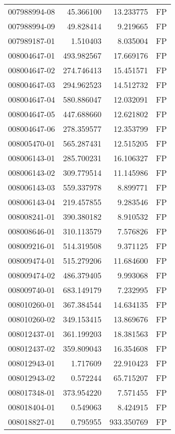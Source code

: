 \begin{tabular}{lrrl}
007988994-08 &   45.366100 &    13.233775 &   FP \\
007988994-09 &   49.828414 &     9.219665 &   FP \\
007989187-01 &    1.510403 &     8.035004 &   FP \\
008004647-01 &  493.982567 &    17.669176 &   FP \\
008004647-02 &  274.746413 &    15.451571 &   FP \\
008004647-03 &  294.962523 &    14.512732 &   FP \\
008004647-04 &  580.886047 &    12.032091 &   FP \\
008004647-05 &  447.688660 &    12.621802 &   FP \\
008004647-06 &  278.359577 &    12.353799 &   FP \\
008005470-01 &  565.287431 &    12.515205 &   FP \\
008006143-01 &  285.700231 &    16.106327 &   FP \\
008006143-02 &  309.779514 &    11.145986 &   FP \\
008006143-03 &  559.337978 &     8.899771 &   FP \\
008006143-04 &  219.457855 &     9.283546 &   FP \\
008008241-01 &  390.380182 &     8.910532 &   FP \\
008008646-01 &  310.113579 &     7.576826 &   FP \\
008009216-01 &  514.319508 &     9.371125 &   FP \\
008009474-01 &  515.279206 &    11.684600 &   FP \\
008009474-02 &  486.379405 &     9.993068 &   FP \\
008009740-01 &  683.149179 &     7.232995 &   FP \\
008010260-01 &  367.384544 &    14.634135 &   FP \\
008010260-02 &  349.153415 &    13.869676 &   FP \\
008012437-01 &  361.199203 &    18.381563 &   FP \\
008012437-02 &  359.809043 &    16.354608 &   FP \\
008012943-01 &    1.717609 &    22.910423 &   FP \\
008012943-02 &    0.572244 &    65.715207 &   FP \\
008017348-01 &  373.954220 &     7.571455 &   FP \\
008018404-01 &    0.549063 &     8.424915 &   FP \\
008018827-01 &    0.795955 &   933.350769 &   FP \\

\end{tabular}
